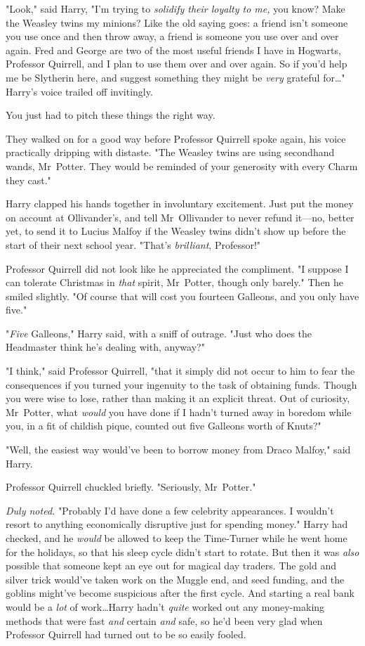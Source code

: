 "Look," said Harry, "I'm trying to \emph{solidify their loyalty to me,} you
know? Make the Weasley twins my minions? Like the old saying goes: a friend
isn't someone you use once and then throw away, a friend is someone you use
over and over again. Fred and George are two of the most useful friends I have
in Hogwarts, Professor Quirrell, and I plan to use them over and over again. So
if you'd help me be Slytherin here, and suggest something they might be
\emph{very} grateful for…" Harry's voice trailed off invitingly.

You just had to pitch these things the right way.

They walked on for a good way before Professor Quirrell spoke again, his voice
practically dripping with distaste. "The Weasley twins are using secondhand
wands, Mr~Potter. They would be reminded of your generosity with every Charm
they cast."

Harry clapped his hands together in involuntary excitement. Just put the money
on account at Ollivander's, and tell Mr~Ollivander to never refund it—no,
better yet, to send it to Lucius Malfoy if the Weasley twins didn't show up
before the start of their next school year. "That's \emph{brilliant},
Professor!"

Professor Quirrell did not look like he appreciated the compliment. "I suppose
I can tolerate Christmas in \emph{that} spirit, Mr~Potter, though only
barely." Then he smiled slightly. "Of course that will cost you fourteen
Galleons, and you only have five."

"\emph{Five} Galleons," Harry said, with a sniff of outrage. "Just who does the
Headmaster think he's dealing with, anyway?"

"I think," said Professor Quirrell, "that it simply did not occur to him to
fear the consequences if you turned your ingenuity to the task of obtaining
funds. Though you were wise to lose, rather than making it an explicit threat.
Out of curiosity, Mr~Potter, what \emph{would} you have done if I hadn't
turned away in boredom while you, in a fit of childish pique, counted out five
Galleons worth of Knuts?"

"Well, the easiest way would've been to borrow money from Draco Malfoy," said
Harry.

Professor Quirrell chuckled briefly. "Seriously, Mr~Potter."

\emph{Duly noted.} "Probably I'd have done a few celebrity appearances. I
wouldn't resort to anything economically disruptive just for spending money."
Harry had checked, and he \emph{would} be allowed to keep the Time-Turner while
he went home for the holidays, so that his sleep cycle didn't start to rotate.
But then it was \emph{also} possible that someone kept an eye out for magical
day traders. The gold and silver trick would've taken work on the Muggle end,
and seed funding, and the goblins might've become suspicious after the first
cycle. And starting a real bank would be a \emph{lot} of work…Harry
hadn't \emph{quite} worked out any money-making methods that were fast
\emph{and} certain \emph{and} safe, so he'd been very glad when Professor
Quirrell had turned out to be so easily fooled.


